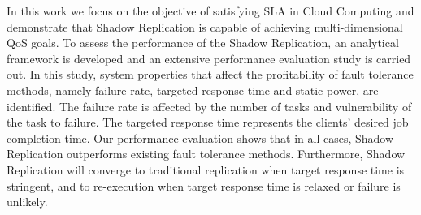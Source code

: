 In this work we focus on the objective of satisfying SLA in Cloud Computing and demonstrate that Shadow Replication is capable of achieving multi-dimensional QoS goals. 
To assess the performance of the Shadow Replication, an analytical framework is developed and 
an extensive performance evaluation study is carried out. 
In this study, system properties that affect the
profitability of fault tolerance methods, namely failure rate,
targeted response time and static power, are identified. The failure rate is
affected by the number of tasks and vulnerability of the task
to failure. The targeted response time represents the 
clients' desired job completion time.  
Our performance evaluation shows that in all cases, Shadow Replication outperforms
existing fault tolerance methods. Furthermore, Shadow
Replication will converge to traditional replication when target response time is stringent, and to re-execution when target response time is relaxed or failure is unlikely.


   





